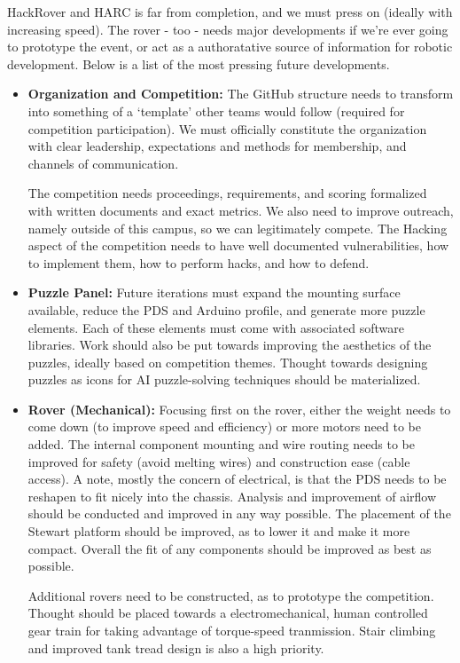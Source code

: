\documentclass[a4paper, 10pt]{article}
\begin{document}
HackRover and HARC is far from completion, and we must press on (ideally with increasing speed). The rover - too - needs major developments if we're ever going to prototype the event, or act as a authoratative source of information for robotic development. Below is a list of the most pressing future developments.

	\begin{itemize}
		\item \textbf{Organization and Competition:} The GitHub structure needs to transform into something of a `template' other teams would follow (required for competition participation). We must officially constitute the organization with clear leadership, expectations and methods for membership, and channels of communication.
		
		The competition needs proceedings, requirements, and scoring formalized with written documents and exact metrics. We also need to improve outreach, namely outside of this campus, so we can legitimately compete. The Hacking aspect of the competition needs to have well documented vulnerabilities, how to implement them, how to perform hacks, and how to defend. 
		
		\item \textbf{Puzzle Panel:} Future iterations must expand the mounting surface available, reduce the PDS and Arduino profile, and generate more puzzle elements. Each of these elements must come with associated software libraries. Work should also be put towards improving the aesthetics of the puzzles, ideally based on competition themes. Thought towards designing puzzles as icons for AI puzzle-solving techniques should be materialized. 
		
		\item \textbf{Rover (Mechanical):} Focusing first on the rover, either the weight needs to come down (to improve speed and efficiency) or more motors need to be added. The internal component mounting and wire routing needs to be improved for safety (avoid melting wires) and construction ease (cable access). A note, mostly the concern of electrical, is that the PDS needs to be reshapen to fit nicely into the chassis. Analysis and improvement of airflow should be conducted and improved in any way possible. The placement of the Stewart platform should be improved, as to lower it and make it more compact. Overall the fit of any components should be improved as best as possible.
		
		Additional rovers need to be constructed, as to prototype the competition. Thought  should be placed towards a electromechanical, human controlled gear train for taking advantage of torque-speed tranmission. Stair climbing and improved tank tread design is also a high priority.
		

\end{itemize}
\end{document}
